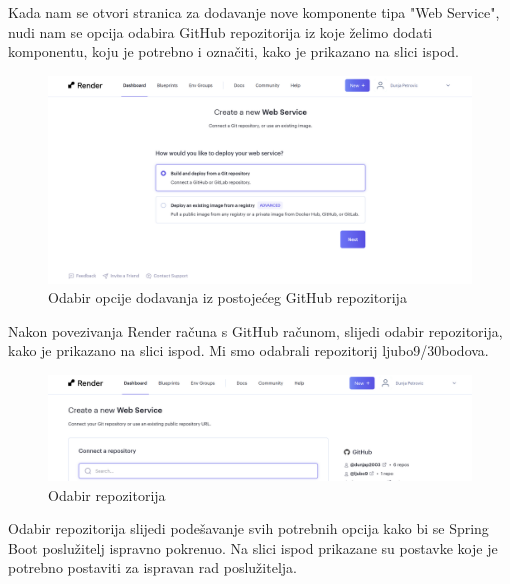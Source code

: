 		Kada nam se otvori stranica za dodavanje nove komponente tipa "Web Service", nudi nam se opcija odabira GitHub repozitorija iz koje želimo dodati komponentu, koju je potrebno i označiti, kako je prikazano na slici ispod.
		
			\begin{figure}[H]
			\includegraphics[scale=0.4]{slike/Render_ODABIR_OPCIJE.PNG} %
			\centering
			\caption{Odabir opcije dodavanja iz postojećeg GitHub repozitorija}
			\label{Odabir opcije dodavanja iz postojećeg GitHub repozitorija}
		\end{figure}
		
	    Nakon povezivanja Render računa s GitHub računom, slijedi odabir repozitorija, kako je prikazano na slici ispod. Mi smo odabrali repozitorij ljubo9/30bodova.
	    
	    	\begin{figure}[H]
			\includegraphics[scale=0.4]{slike/Render_ODABIR_REPOZITORIJA.PNG} %
			\centering
			\caption{Odabir repozitorija}
			\label{Odabir repozitorija}
		\end{figure}
		
		Odabir repozitorija slijedi podešavanje svih potrebnih opcija kako bi se Spring Boot poslužitelj ispravno pokrenuo. Na slici ispod prikazane su postavke koje je potrebno postaviti za ispravan rad poslužitelja.
		
